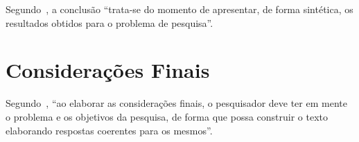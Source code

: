 \documentclass[font=plain,chapter=TITLE,section=Title,espaco=duplo,tocpage=plain,appendix=Name,floatnumber=continuous]{abnt}
\begin{document}
Segundo~\cite{normasUTP}, a conclusão “trata-se do momento de apresentar,
de forma sintética, os resultados obtidos para o problema de pesquisa”.

\chapter{Considerações Finais}

Segundo~\cite{normasUTP}, “ao elaborar as considerações finais, o
pesquisador deve ter em mente o problema e os objetivos da pesquisa, de
forma que possa construir o texto elaborando respostas coerentes para os
mesmos”.

%
%

\end{document}

